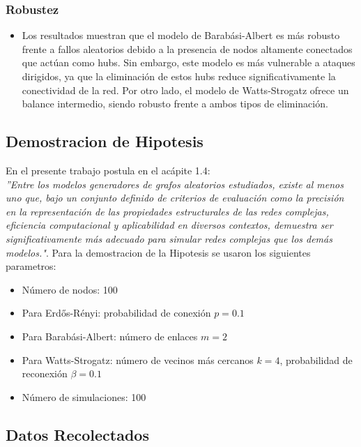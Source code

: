 \subsubsection{Robustez}
\begin{itemize}
    \item Los resultados muestran que el modelo de Barabási-Albert es más robusto frente a fallos aleatorios debido a la presencia de nodos altamente conectados que actúan como hubs. Sin embargo, este modelo es más vulnerable a ataques dirigidos, ya que la eliminación de estos hubs reduce significativamente la conectividad de la red. Por otro lado, el modelo de Watts-Strogatz ofrece un balance intermedio, siendo robusto frente a ambos tipos de eliminación.
\end{itemize}

\subsection{Demostracion de Hipotesis}
En el presente trabajo postula en el acápite 1.4:\\
\textit{''Entre los modelos generadores de grafos aleatorios estudiados, existe al menos uno que, bajo un conjunto definido de criterios de evaluación como la precisión en la representación de las propiedades estructurales de las redes complejas, eficiencia computacional y aplicabilidad en diversos contextos, demuestra ser significativamente más adecuado para simular redes complejas que los demás modelos."}.
Para la demostracion de la Hipotesis se usaron los siguientes parametros:
\begin{itemize}
    \item Número de nodos: 100
    \item Para Erdős-Rényi: probabilidad de conexión \(p = 0.1\)
    \item Para Barabási-Albert: número de enlaces \(m = 2\)
    \item Para Watts-Strogatz: número de vecinos más cercanos \(k = 4\), probabilidad de reconexión \(\beta = 0.1\)
    \item Número de simulaciones: 100
\end{itemize}

\subsection{Datos Recolectados}

